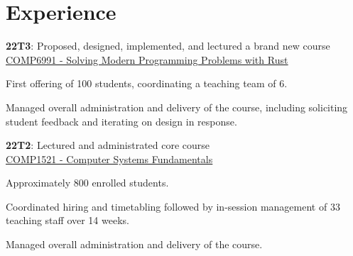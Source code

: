 \documentclass[a4paper]{deedy-resume}
\begin{document}
\begin{minipage}[t]{0.63\textwidth}


\section{Experience}


\vspace{\topsep} %
\begin{tightitemize}
\item
	\textbf{22T3}: Proposed, designed, implemented, and lectured
	a brand new course \\
	\href{https://www.handbook.unsw.edu.au/undergraduate/courses/current/COMP6991}
		 {\underline{COMP6991 - Solving Modern Programming Problems with Rust}}
\item First offering of 100 students, coordinating a teaching team of 6.
\item Managed overall administration and delivery of the course,
	  including soliciting student feedback and
	  iterating on design in response.
\item
	\textbf{22T2}: Lectured and administrated core course \\
	\href{https://www.handbook.unsw.edu.au/undergraduate/courses/current/COMP1521}
		 {\underline{COMP1521 - Computer Systems Fundamentals}}
\item Approximately 800 enrolled students.
\item Coordinated hiring and timetabling followed by
	  in-session management of 33 teaching staff over 14 weeks.
\item Managed overall administration and delivery of the course.
\end{tightitemize}

\sectionspace




\end{minipage}
\end{document}
